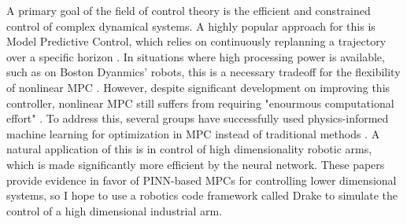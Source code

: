 \documentclass[11pt, titlepage]{article}
\begin{document}
A primary goal of the field of control theory is the efficient and constrained control of complex dynamical systems. A highly popular approach for this is Model Predictive Control, which relies on continuously replanning a trajectory over a specific horizon \cite{mpc_industry}. In situations where high processing power is available, such as on Boston Dyanmics' robots, this is a necessary tradeoff for the flexibility of nonlinear MPC \cite{spot}. However, despite significant development on improving this controller, nonlinear MPC still suffers from requiring "enourmous computational effort" \cite{mpc_computation}. To address this, several groups have successfully used physics-informed machine learning for optimization in MPC instead of traditional methods \cite{pinn_mpc_manipulators, pinns_mpc}. A natural application of this is in control of high dimensionality robotic arms, which is made significantly more efficient by the neural network. These papers provide evidence in favor of PINN-based MPCs for controlling lower dimensional systems, so I hope to use a robotics code framework called Drake \cite{drake} to simulate the control of a high dimensional industrial arm.



\end{document}
